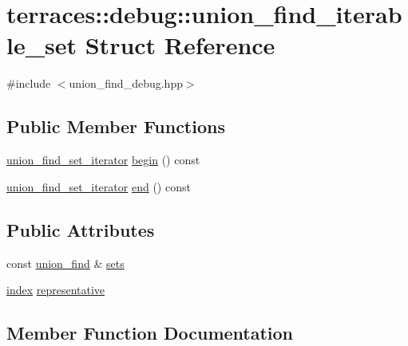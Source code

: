 \hypertarget{structterraces_1_1debug_1_1union__find__iterable__set}{}\section{terraces\+:\+:debug\+:\+:union\+\_\+find\+\_\+iterable\+\_\+set Struct Reference}
\label{structterraces_1_1debug_1_1union__find__iterable__set}


{\ttfamily \#include $<$union\+\_\+find\+\_\+debug.\+hpp$>$}

\subsection*{Public Member Functions}
\begin{DoxyCompactItemize}
\item 
\hyperlink{classterraces_1_1debug_1_1union__find__set__iterator}{union\+\_\+find\+\_\+set\+\_\+iterator} \hyperlink{structterraces_1_1debug_1_1union__find__iterable__set_a9a34267072f4beccb2429ab059785681}{begin} () const
\item 
\hyperlink{classterraces_1_1debug_1_1union__find__set__iterator}{union\+\_\+find\+\_\+set\+\_\+iterator} \hyperlink{structterraces_1_1debug_1_1union__find__iterable__set_a8ae3dd5617741339427c6f301f3f99c7}{end} () const
\end{DoxyCompactItemize}
\subsection*{Public Attributes}
\begin{DoxyCompactItemize}
\item 
const \hyperlink{classterraces_1_1union__find}{union\+\_\+find} \& \hyperlink{structterraces_1_1debug_1_1union__find__iterable__set_aa14c4d14c3fd1ab5caad38c37457457c}{sets}
\item 
\hyperlink{namespaceterraces_adbc33ccb543d1634e96d0eb02e472c77}{index} \hyperlink{structterraces_1_1debug_1_1union__find__iterable__set_a2984a7dbd4f05c6779040c41f9734ec2}{representative}
\end{DoxyCompactItemize}


\subsection{Member Function Documentation}
\mbox{\label{structterraces_1_1debug_1_1union__find__iterable__set_a9a34267072f4beccb2429ab059785681}} 
